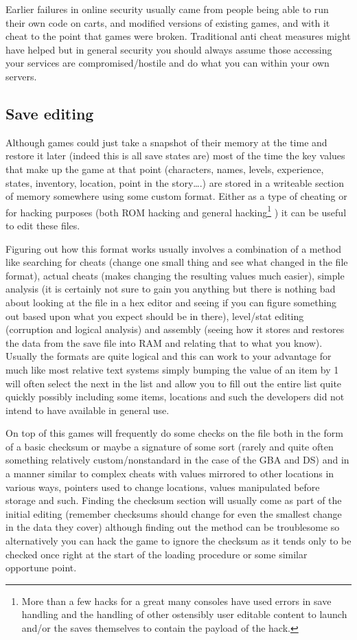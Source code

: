 \documentclass[
]{book}
\begin{document}
Earlier failures in online security usually came from people being able to run their own code on carts, and modified versions of existing games, and with it cheat to the point that games were broken. Traditional anti cheat measures might have helped but in general security you should always assume those accessing your services are compromised/hostile and do what you can within your own servers.

\hypertarget{save-editing}{%
\subsection{Save editing}\label{save-editing}}

Although games could just take a snapshot of their memory at the time and restore it later (indeed this is all save states are) most of the time the key values that make up the game at that point (characters, names, levels, experience, states, inventory, location, point in the story\ldots.) are stored in a writeable section of memory somewhere using some custom format. Either as a type of cheating or for hacking purposes (both ROM hacking and general hacking\footnote{More than a few hacks for a great many consoles have used errors in save handling and the handling of other ostensibly user editable content to launch and/or the saves themselves to contain the payload of the hack.} ) it can be useful to edit these files.

Figuring out how this format works usually involves a combination of a method like searching for cheats (change one small thing and see what changed in the file format), actual cheats (makes changing the resulting values much easier), simple analysis (it is certainly not sure to gain you anything but there is nothing bad about looking at the file in a hex editor and seeing if you can figure something out based upon what you expect should be in there), level/stat editing (corruption and logical analysis) and assembly (seeing how it stores and restores the data from the save file into RAM and relating that to what you know). Usually the formats are quite logical and this can work to your advantage for much like most relative text systems simply bumping the value of an item by 1 will often select the next in the list and allow you to fill out the entire list quite quickly possibly including some items, locations and such the developers did not intend to have available in general use.

On top of this games will frequently do some checks on the file both in the form of a basic checksum or maybe a signature of some sort (rarely and quite often something relatively custom/nonstandard in the case of the GBA and DS) and in a manner similar to complex cheats with values mirrored to other locations in various ways, pointers used to change locations, values manipulated before storage and such. Finding the checksum section will usually come as part of the initial editing (remember checksums should change for even the smallest change in the data they cover) although finding out the method can be troublesome so alternatively you can hack the game to ignore the checksum as it tends only to be checked once right at the start of the loading procedure or some similar opportune point.
\end{document}
